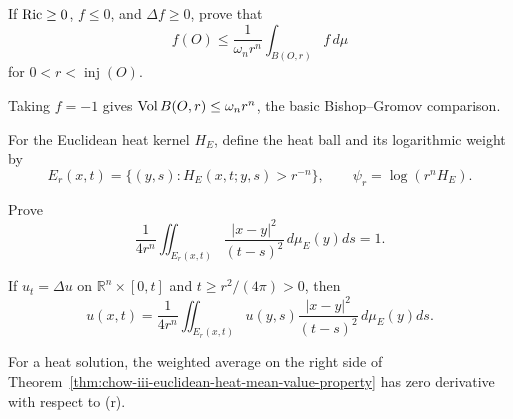\begin{claim}
\label{clm:chow-iii-nonpositive-subharmonic-mean-value-exercise}

If \(\operatorname{Ric}\ge0\), \(f\le0\), and \(\Delta f\ge0\), prove that
\[
 f(O)\le\frac1{\omega_nr^n}\int_{B(O,r)}f\,d\mu
\]
for \(0<r<\operatorname{inj}(O)\).
\end{claim}

\begin{remark}
\label{rem:chow-iii-nonnegative-ricci-euclidean-volume-bound}


Taking \(f=-1\) gives \(\operatorname{Vol} B(O,r)\le\omega_nr^n\), the basic
Bishop--Gromov comparison.
\end{remark}

For the Euclidean heat kernel \(H_E\), define the heat ball and its logarithmic
weight by
\[
 E_r(x,t)=\{(y,s):H_E(x,t;y,s)>r^{-n}\},
 \qquad \psi_r=\log(r^nH_E).
\]

\begin{claim}
\label{clm:chow-iii-euclidean-heat-ball-normalization-exercise}

Prove
\[
 \frac1{4r^n}\iint_{E_r(x,t)}\frac{|x-y|^2}{(t-s)^2}
 \,d\mu_E(y)ds=1.
\]
\end{claim}

\begin{theorem}
\label{thm:chow-iii-euclidean-heat-mean-value-property}


If \(u_t=\Delta u\) on \(\mathbb R^n\times[0,t]\) and
\(t\ge r^2/(4\pi)>0\), then
\[
 u(x,t)=\frac1{4r^n}\iint_{E_r(x,t)}u(y,s)
 \frac{|x-y|^2}{(t-s)^2}\,d\mu_E(y)ds.
\]
\end{theorem}

\begin{lemma}
\label{lem:chow-iii-euclidean-heat-ball-average-stationary}

For a heat solution, the weighted average on the right side of
Theorem~\ref{thm:chow-iii-euclidean-heat-mean-value-property} has zero
derivative with respect to (r).
\end{lemma}


